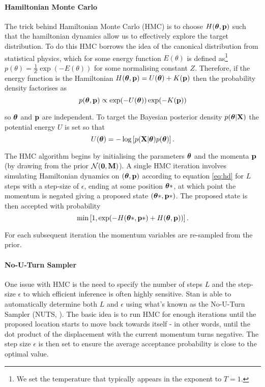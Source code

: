 \paragraph{Hamiltonian Monte Carlo}

The trick behind Hamiltonian Monte Carlo (HMC) is to choose $H(\bm{\theta}, \mathbf{p})$ such that the hamiltonian dynamics allow us to effectively explore the target distribution. To do this HMC borrows the idea of the canonical distribution from statistical physics, which for some energy function $E(\theta)$ is defined as\footnote{We set the temperature that typically appears in the exponent to $T=1$.} $p(\theta) = \frac{1}{Z}\exp(-E(\theta))$ for some normalising constant $Z$. Therefore, if the energy function is the Hamiltonian $H(\bm{\theta}, \mathbf{p}) = U(\bm{\theta}) + K(\mathbf{p})$ then the probability density factorises as
\begin{equation}
	p(\bm{\theta}, \mathbf{p}) \propto \exp(-U(\bm{\theta})) \exp(-K(\mathbf{p}))
\end{equation}

so $\bm{\theta}$ and $\mathbf{p}$ are independent. To target the Bayesian posterior density $p(\bm{\theta} | \mathbf{X})$ the potential energy $U$ is set so that
\begin{equation}
	U(\bm{\theta}) = -\log\left[ p(\mathbf{X} | \bm{\theta}) p(\bm{\theta} )\right].
\end{equation}

The HMC algorithm begins by initialising the parameters $\bm{\theta}$ and the momenta $\mathbf{p}$ (by drawing from the prior $\mathcal{N}(\bm{0}, \mathbf{M})$). A single HMC iteration involves simulating Hamiltonian dynamics on $(\bm{\theta}, \mathbf{p})$ according to equation \ref{eq:hd} for $L$ steps with a step-size of $\epsilon$, ending at some position $\bm{\theta}*$, at which point the momentum is negated giving a proposed state $(\bm{\theta}*, \mathbf{p}*)$. The proposed state is then accepted with probability
\begin{equation}
	\text{min}\left[ 1, \exp(-H(\bm{\theta}*, \mathbf{p}*) + H(\bm{\theta}, \mathbf{p}))\right].
\end{equation}

For each subsequent iteration the momentum variables are re-sampled from the prior.

\paragraph{No-U-Turn Sampler}

One issue with HMC is the need to specify the number of steps $L$ and the step-size $\epsilon$ to which efficient inference is often highly sensitive. Stan is able to automatically determine both $L$ and $\epsilon$ using what's known as the No-U-Turn Sampler (NUTS, \cite{Hoffman2014-pl}). The basic idea is to run HMC for enough iterations until the proposed location starts to move back towards itself - in other words, until the dot product of the displacement with the current momentum turns negative. The step size $\epsilon$ is then set to ensure the average acceptance probability is close to the optimal value.




